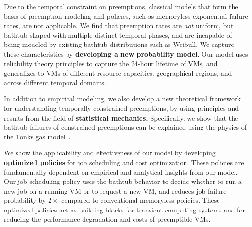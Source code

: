 Due to the temporal constraint on preemptions, classical models that form the basis of preemption modeling and policies, such as memoryless exponential failure rates, are not applicable. 
%
We find that preemption rates are \emph{not} uniform, but bathtub shaped with multiple distinct temporal phases, and are incapable of being modeled by existing bathtub distributions such as Weibull.
%
We capture these characteristics by \textbf{developing a new probability model}. 
Our model uses reliability theory principles to capture the 24-hour lifetime of VMs, and generalizes to VMs of different resource capacities, geographical regions, and across different temporal domains.


In addition to empirical modeling, we also develop a new theoretical framework for understanding temporally constrained preemptions, by using principles and results from the field of \textbf{statistical mechanics.} 
Specifically, we show that the bathtub failures of constrained preemptions can be explained using the physics of the Tonks gas model~\cite{tonks, krauth2006statistical}. 




We show the applicability and effectiveness of our model by developing \textbf{optimized policies} for job scheduling and cost optimization. 
These policies are fundamentally dependent on empirical and analytical insights from our model. %
%
Our job-scheduling policy uses the bathtub behavior to decide whether to run a new job on a running VM or to request a new VM, and reduces job-failure probability by $2\times$ compared to  conventional memoryless policies. 
%
%
%
These optimized policies act as building blocks for transient computing systems and for reducing the performance degradation and costs of preemptible VMs. 


